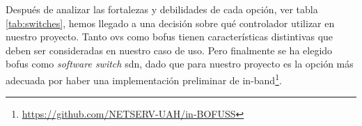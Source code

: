 

Después de analizar las fortalezas y debilidades de cada opción, ver tabla \ref{tab:switches}, hemos llegado a una decisión sobre qué controlador utilizar en nuestro proyecto. Tanto \gls{ovs} como \gls{bofus} tienen características distintivas que deben ser consideradas en nuestro caso de uso. Pero finalmente se ha elegido \gls{bofus} como \textit{software switch} \gls{sdn}, dado que para nuestro proyecto es la opción más adecuada por haber una implementación preliminar de in-band\footnote{\url{https://github.com/NETSERV-UAH/in-BOFUSS}}.